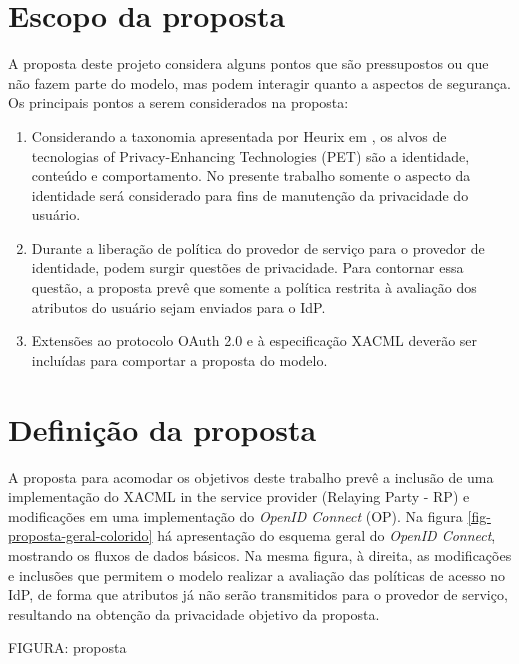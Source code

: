 \documentclass{doublecol-new}
\begin{document}
\section{Escopo da proposta}

A proposta deste projeto considera alguns pontos que são pressupostos ou que não fazem parte do modelo, mas podem interagir quanto a aspectos de segurança. Os principais pontos a serem considerados na proposta:
\begin{enumerate}
	\item Considerando a taxonomia apresentada por Heurix em \cite{heurix2015taxonomy}, os alvos de tecnologias of Privacy-Enhancing Technologies (PET) são a identidade, conteúdo e comportamento. No presente trabalho somente o aspecto da identidade será considerado para fins de manutenção da privacidade do usuário.
	\item Durante a liberação de política do provedor de serviço para o provedor de identidade, podem surgir questões de privacidade. Para contornar essa questão, a proposta prevê que somente a política restrita à avaliação dos atributos do usuário sejam enviados para o IdP.
	\item Extensões ao protocolo OAuth 2.0 e à especificação XACML deverão ser incluídas para comportar a proposta do modelo.
\end{enumerate}

\section{Definição da proposta}

A proposta para acomodar os objetivos deste trabalho prevê a inclusão de uma implementação do XACML in the service provider (Relaying Party - RP) e modificações em uma implementação do \textit{OpenID Connect} (OP). Na figura \ref{fig-proposta-geral-colorido} há apresentação do esquema geral do \textit{OpenID Connect}, mostrando os fluxos de dados básicos. Na mesma figura, à direita, as modificações e inclusões que permitem o modelo realizar a avaliação das políticas de acesso no IdP, de forma que atributos já não serão transmitidos para o provedor de serviço, resultando na obtenção da privacidade objetivo da proposta. 

FIGURA: proposta
\end{document}
